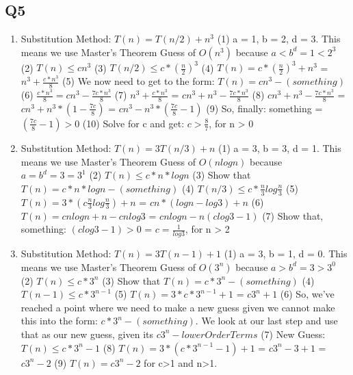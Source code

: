 \documentclass{article}
\begin{document}
\subsection*{Q5}
\begin{enumerate}[label=(\alph*)]
    \item Substitution Method: $T(n) = T(n/2) + n^3$
    \subitem (1) a = 1, b = 2, d = 3. This means we use Master's Theorem Guess of $O(n^3)$ because $a < b^d = 1 < 2^3$
    \subitem (2) $T(n) \leq cn^3$
    \subitem (3) $T(n/2) \leq c* (\frac{n}{2})^3$
    \subitem (4) $T(n) = c*(\frac{n}{2})^3 + n^3$ = $n^3 + \frac{c*n^3}{8}$
    \subitem (5) We now need to get to the form: $T(n) = cn^3 - (something)$
    \subitem (6) $\frac{c*n^3}{8} = cn^3 - \frac{7c*n^3}{8}$
    \subitem (7) $n^3 + \frac{c*n^3}{8}$ = $cn^3 + n^3 - \frac{7c*n^3}{8}$
    \subitem (8) $cn^3 + n^3 - \frac{7c*n^3}{8}$ = $cn^3 + n^3 * (1 - \frac{7c}{8})$ = $cn^3 - n^3 * (\frac{7c}{8} - 1)$
    \subitem (9) So, finally: something = $(\frac{7c}{8} - 1) > 0$
    \subitem (10) Solve for c and get: $c > \frac{8}{7}$, for n > 0

    \item Substitution Method: $T(n) = 3T(n/3) + n$
    \subitem (1) a = 3, b = 3, d = 1. This means we use Master's Theorem Guess of $O(nlogn)$ because $a = b^d = 3 = 3^1$
    \subitem (2) $T(n) \leq c*n*logn$
    \subitem (3) Show that $T(n) = c*n*logn - (something)$
    \subitem (4) $T(n/3) \leq c*\frac{n}{3}log\frac{n}{3}$
    \subitem (5) $T(n) = 3 * (c\frac{n}{3}log\frac{n}{3}) + n$ = $cn*(logn-log3) + n$
    \subitem (6) $T(n) = cnlogn + n -cnlog3$ = $cnlogn - n (clog3 - 1)$
    \subitem (7) Show that, something: $(clog3 - 1) > 0$ = $c = \frac{1}{log3}$, for n > 2

    \item Substitution Method: $T(n) = 3T(n-1) + 1$
    \subitem (1) a = 3, b = 1, d = 0. This means we use Master's Theorem Guess of $O(3^n)$ because $a > b^d = 3 > 3^0$
    \subitem (2) $T(n) \leq c*3^n$
    \subitem (3) Show that $T(n) = c*3^n - (something)$
    \subitem (4) $T(n-1) \leq c*3^{n-1}$
    \subitem (5) $T(n) =  3*c*3^{n-1} + 1$ = $c3^n+1$
    \subitem (6) So, we've reached a point where we need to make a new guess given we cannot make this into the form: $c*3^n - (something)$. We look at our last step and use that as our new guess, given its $c3^n - lowerOrderTerms$
    \subitem (7) New Guess: $T(n) \leq c*3^n - 1$
    \subitem (8) $T(n) =  3*(c*3^{n-1}-1)+ 1$ = $c3^n - 3 + 1$ = $c3^n - 2$
    \subitem (9) $T(n) = c3^n - 2$ for c>1 and n>1.
 

\end{enumerate}
\end{document}
